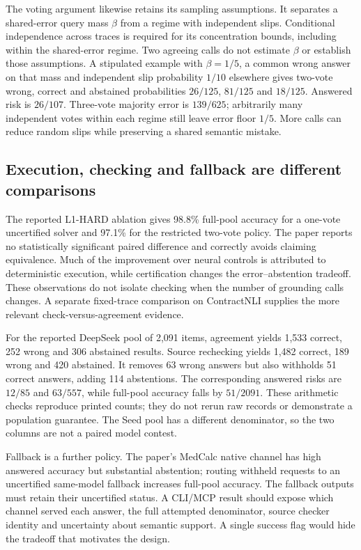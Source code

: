 The voting argument likewise retains its sampling assumptions. It separates
a shared-error query mass $\beta$ from a regime with independent slips.
Conditional independence across traces is required for its concentration
bounds, including within the shared-error regime. Two agreeing calls do
not estimate $\beta$ or establish those assumptions. A stipulated example
with $\beta=1/5$, a common wrong answer on that mass and independent slip
probability $1/10$ elsewhere gives two-vote wrong, correct and abstained
probabilities $26/125$, $81/125$ and $18/125$. Answered risk is $26/107$.
Three-vote majority error is $139/625$; arbitrarily many independent votes
within each regime still leave error floor $1/5$. More calls can reduce
random slips while preserving a shared semantic mistake.
\citep{exec23_controlled_writes_paper,exec23_controlled_writes_reference}

\subsection{Execution, checking and fallback are different comparisons}
\label{exec23:controlled-writes-results}
The reported L1-HARD ablation gives 98.8\% full-pool accuracy for a one-vote
uncertified solver and 97.1\% for the restricted two-vote policy. The paper
reports no statistically significant paired difference and correctly avoids
claiming equivalence. Much of the improvement over neural controls is
attributed to deterministic execution, while certification changes the
error--abstention tradeoff. These observations do not isolate checking when
the number of grounding calls changes. A separate fixed-trace comparison
on ContractNLI supplies the more relevant check-versus-agreement evidence.
\citep{exec23_controlled_writes_paper}

For the reported DeepSeek pool of 2,091 items, agreement yields
1,533 correct, 252 wrong and 306 abstained results. Source rechecking yields
1,482 correct, 189 wrong and 420 abstained. It removes 63 wrong answers but
also withholds 51 correct answers, adding 114 abstentions. The corresponding
answered risks are $12/85$ and $63/557$, while full-pool accuracy falls by
$51/2091$. These arithmetic checks reproduce printed counts; they do not
rerun raw records or demonstrate a population guarantee. The Seed pool has
a different denominator, so the two columns are not a paired model contest.
\citep{exec23_controlled_writes_paper,exec23_controlled_writes_reference}

Fallback is a further policy. The paper's MedCalc native channel has high
answered accuracy but substantial abstention; routing withheld requests to
an uncertified same-model fallback increases full-pool accuracy. The fallback
outputs must retain their uncertified status. A CLI/MCP result should expose
which channel served each answer, the full attempted denominator, source
checker identity and uncertainty about semantic support. A single success
flag would hide the tradeoff that motivates the design.
\citep{exec23_controlled_writes_paper}

